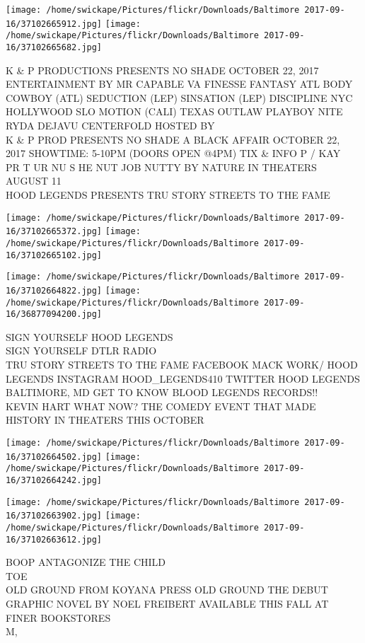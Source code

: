 \documentclass[10pt,letterpaper]{article}
\begin{document}
\texttt{[image: /home/swickape/Pictures/flickr/Downloads/Baltimore 2017-09-16/37102665912.jpg]}
\texttt{[image: /home/swickape/Pictures/flickr/Downloads/Baltimore 2017-09-16/37102665682.jpg]}

K \& P PRODUCTIONS PRESENTS NO SHADE OCTOBER 22, 2017 ENTERTAINMENT BY MR CAPABLE VA FINESSE FANTASY ATL BODY COWBOY (ATL) SEDUCTION (LEP) SINSATION (LEP) DISCIPLINE NYC HOLLYWOOD SLO MOTION (CALI) TEXAS OUTLAW PLAYBOY NITE RYDA DEJAVU CENTERFOLD HOSTED BY\\
K \& P PROD PRESENTS NO SHADE A BLACK AFFAIR OCTOBER 22, 2017 SHOWTIME: 5{-}10PM (DOORS OPEN @4PM) TIX \& INFO P / KAY\\
PR T UR NU S HE NUT JOB NUTTY BY NATURE IN THEATERS AUGUST 11\\
HOOD LEGENDS PRESENTS TRU STORY STREETS TO THE FAME
\pagebreak

\texttt{[image: /home/swickape/Pictures/flickr/Downloads/Baltimore 2017-09-16/37102665372.jpg]}
\texttt{[image: /home/swickape/Pictures/flickr/Downloads/Baltimore 2017-09-16/37102665102.jpg]}

\texttt{[image: /home/swickape/Pictures/flickr/Downloads/Baltimore 2017-09-16/37102664822.jpg]}
\texttt{[image: /home/swickape/Pictures/flickr/Downloads/Baltimore 2017-09-16/36877094200.jpg]}

SIGN YOURSELF HOOD LEGENDS\\
SIGN YOURSELF DTLR RADIO\\
TRU STORY STREETS TO THE FAME FACEBOOK MACK WORK/ HOOD LEGENDS INSTAGRAM HOOD\_LEGENDS410 TWITTER HOOD LEGENDS BALTIMORE, MD GET TO KNOW BLOOD LEGENDS RECORDS!!\\
KEVIN HART WHAT NOW?  THE COMEDY EVENT THAT MADE HISTORY IN THEATERS THIS OCTOBER
\pagebreak

\texttt{[image: /home/swickape/Pictures/flickr/Downloads/Baltimore 2017-09-16/37102664502.jpg]}
\texttt{[image: /home/swickape/Pictures/flickr/Downloads/Baltimore 2017-09-16/37102664242.jpg]}

\texttt{[image: /home/swickape/Pictures/flickr/Downloads/Baltimore 2017-09-16/37102663902.jpg]}
\texttt{[image: /home/swickape/Pictures/flickr/Downloads/Baltimore 2017-09-16/37102663612.jpg]}

BOOP ANTAGONIZE THE CHILD\\
TOE\\
OLD GROUND FROM KOYANA PRESS OLD GROUND THE DEBUT GRAPHIC NOVEL BY NOEL FREIBERT AVAILABLE THIS FALL AT FINER BOOKSTORES\\
M,
\pagebreak
\end{document}
